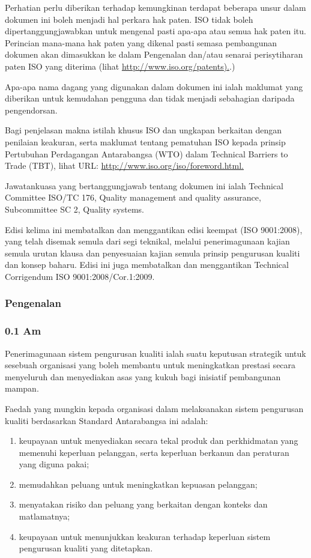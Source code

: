 \documentclass[
]{article}
\begin{document}
Perhatian perlu diberikan terhadap kemungkinan terdapat beberapa unsur
dalam dokumen ini boleh menjadi hal perkara hak paten. ISO tidak boleh
dipertanggungjawabkan untuk mengenal pasti apa-apa atau semua hak paten
itu. Perincian mana-mana hak paten yang dikenal pasti semasa pembangunan
dokumen akan dimasukkan ke dalam Pengenalan dan/atau senarai
perisytiharan paten ISO yang diterima (lihat
\href{http://www.iso.org/patents}{http://www.iso.org/patents).}.)

Apa-apa nama dagang yang digunakan dalam dokumen ini ialah maklumat yang
diberikan untuk kemudahan pengguna dan tidak menjadi sebahagian daripada
pengendorsan.

Bagi penjelasan makna istilah khusus ISO dan ungkapan berkaitan dengan
penilaian keakuran, serta maklumat tentang pematuhan ISO kepada prinsip
Pertubuhan Perdagangan Antarabangsa (WTO) dalam Technical Barriers to
Trade (TBT), lihat URL: \url{http://www.iso.org/iso/foreword.html.}

Jawatankuasa yang bertanggungjawab tentang dokumen ini ialah Technical
Committee ISO/TC 176, Quality management and quality assurance,
Subcommittee SC 2, Quality systems.

Edisi kelima ini membatalkan dan menggantikan edisi keempat (ISO
9001:2008), yang telah disemak semula dari segi teknikal, melalui
penerimagunaan kajian semula urutan klausa dan penyesuaian kajian semula
prinsip pengurusan kualiti dan konsep baharu. Edisi ini juga membatalkan
dan menggantikan Technical Corrigendum ISO 9001:2008/Cor.1:2009.

\hypertarget{pengenalan}{%
\subsubsection{Pengenalan}\label{pengenalan}}

\hypertarget{am}{%
\subsubsection{0.1 Am}\label{am}}

Penerimagunaan sistem pengurusan kualiti ialah suatu keputusan strategik
untuk sesebuah organisasi yang boleh membantu untuk meningkatkan
prestasi secara menyeluruh dan menyediakan asas yang kukuh bagi
inisiatif pembangunan mampan.

Faedah yang mungkin kepada organisasi dalam melaksanakan sistem
pengurusan kualiti berdasarkan Standard Antarabangsa ini adalah:

\begin{enumerate}
\def\labelenumi{\alph{enumi})}
\item
  keupayaan untuk menyediakan secara tekal produk dan perkhidmatan yang
  memenuhi keperluan pelanggan, serta keperluan berkanun dan peraturan
  yang diguna pakai;
\item
  memudahkan peluang untuk meningkatkan kepuasan pelanggan;
\item
  menyatakan risiko dan peluang yang berkaitan dengan konteks dan
  matlamatnya;
\item
  keupayaan untuk menunjukkan keakuran terhadap keperluan sistem
  pengurusan kualiti yang ditetapkan.
\end{enumerate}
\end{document}
